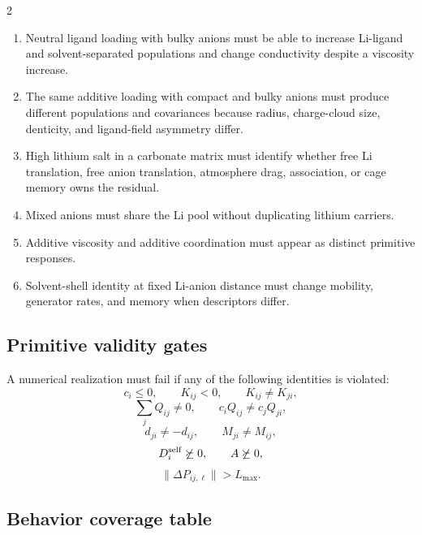 \documentclass[10pt]{article}
\begin{document}
\begin{multicols}{2}
\begin{enumerate}
\item Neutral ligand loading with bulky anions must be able to increase
Li-ligand and solvent-separated populations and change conductivity despite a
viscosity increase.
\item The same additive loading with compact and bulky anions must produce
different populations and covariances because radius, charge-cloud size,
denticity, and ligand-field asymmetry differ.
\item High lithium salt in a carbonate matrix must identify whether free Li
translation, free anion translation, atmosphere drag, association, or cage
memory owns the residual.
\item Mixed anions must share the Li pool without duplicating lithium carriers.
\item Additive viscosity and additive coordination must appear as distinct
primitive responses.
\item Solvent-shell identity at fixed Li-anion distance must change mobility,
generator rates, and memory when descriptors differ.
\end{enumerate}

\subsection{Primitive validity gates}

A numerical realization must fail if any of the following identities is violated:
\[
c_i\le0,\qquad
K_{ij}<0,\qquad
K_{ij}\ne K_{ji},
\]
\[
\sum_jQ_{ij}\ne0,\qquad
c_iQ_{ij}\ne c_jQ_{ji},
\]
\[
d_{ji}\ne-d_{ij},\qquad
M_{ji}\ne M_{ij},
\]
\[
D_i^{\rm self}\not\succeq0,\qquad
A\not\succeq0,
\]
\[
\|\Delta P_{ij,\ell}\|>L_{\max}.
\]

\subsection{Behavior coverage table}


\end{multicols}
\end{document}
